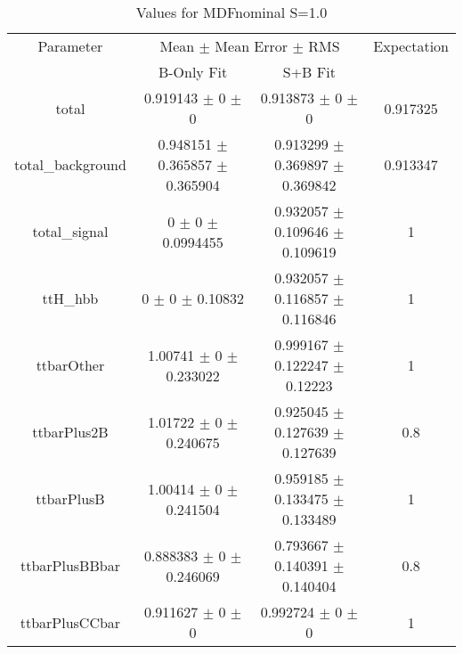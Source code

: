 \begin{table}
\centering
\caption{Values for MDFnominal S=1.0}
\begin{tabular}{cccc}
\toprule
Parameter & \multicolumn{2}{c}{Mean $\pm$ Mean Error $\pm$ RMS} & Expectation\\
 & B-Only Fit & S+B Fit & \\
\midrule
total & \num{0.919143} $\pm$ \num{0} $\pm$ \num{0} & \num{0.913873} $\pm$ \num{0} $\pm$ \num{0} & \num{0.917325}\\
total\_background & \num{0.948151} $\pm$ \num{0.365857} $\pm$ \num{0.365904} & \num{0.913299} $\pm$ \num{0.369897} $\pm$ \num{0.369842} & \num{0.913347}\\
total\_signal & \num{0} $\pm$ \num{0} $\pm$ \num{0.0994455} & \num{0.932057} $\pm$ \num{0.109646} $\pm$ \num{0.109619} & \num{1}\\
ttH\_hbb & \num{0} $\pm$ \num{0} $\pm$ \num{0.10832} & \num{0.932057} $\pm$ \num{0.116857} $\pm$ \num{0.116846} & \num{1}\\
ttbarOther & \num{1.00741} $\pm$ \num{0} $\pm$ \num{0.233022} & \num{0.999167} $\pm$ \num{0.122247} $\pm$ \num{0.12223} & \num{1}\\
ttbarPlus2B & \num{1.01722} $\pm$ \num{0} $\pm$ \num{0.240675} & \num{0.925045} $\pm$ \num{0.127639} $\pm$ \num{0.127639} & \num{0.8}\\
ttbarPlusB & \num{1.00414} $\pm$ \num{0} $\pm$ \num{0.241504} & \num{0.959185} $\pm$ \num{0.133475} $\pm$ \num{0.133489} & \num{1}\\
ttbarPlusBBbar & \num{0.888383} $\pm$ \num{0} $\pm$ \num{0.246069} & \num{0.793667} $\pm$ \num{0.140391} $\pm$ \num{0.140404} & \num{0.8}\\
ttbarPlusCCbar & \num{0.911627} $\pm$ \num{0} $\pm$ \num{0} & \num{0.992724} $\pm$ \num{0} $\pm$ \num{0} & \num{1}\\
\bottomrule
\end{tabular}
\end{table}